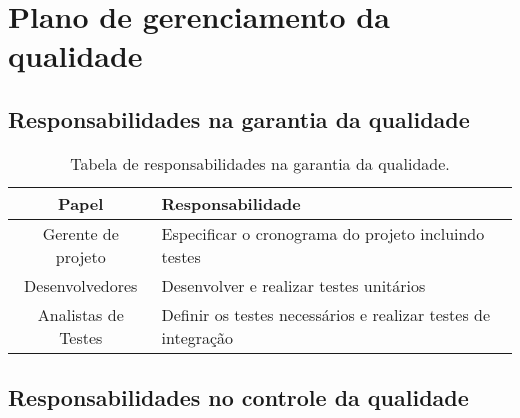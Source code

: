 
\chapter{Plano de gerenciamento da qualidade}

\section{Responsabilidades na garantia da qualidade}


\begin{table}[H]
	\begin{tabularx}{\textwidth}{| c | X |}
		\hline
		\textbf{Papel}     & \textbf{Responsabilidade}                            \\
		\hline
		Gerente de projeto & Especificar o cronograma do projeto incluindo testes \\
		\hline
		Desenvolvedores & Desenvolver e realizar testes unitários  \\
		\hline
		Analistas de Testes & Definir os testes necessários e realizar testes de integração \\
		\hline
	\end{tabularx}
	\centering
	\caption{Tabela de responsabilidades na garantia da qualidade.}
	\label{tab:responsability-quality-guarantee}
\end{table}

\section{Responsabilidades no controle da qualidade}

